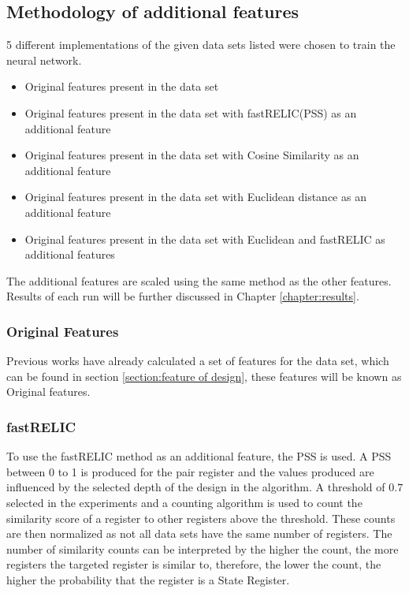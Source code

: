\documentclass{tum-book}
\begin{document}
        \subsection{Methodology of additional features}\label{subsection:methodology of additional features}
        5 different implementations of the given data sets listed were chosen to train the neural network.
        \bigskip\begin{itemize}
            \item Original features present in the data set 
            \item Original features present in the data set with fastRELIC(PSS) as an additional feature
            \item Original features present in the data set with Cosine Similarity as an additional feature
            \item Original features present in the data set with Euclidean distance as an additional feature
            \item Original features present in the data set with Euclidean and fastRELIC as additional features
        \end{itemize}
        The additional features are scaled using the same method as the other features. Results of each run will be further discussed in Chapter \ref{chapter:results}.
        
        
        \subsubsection{Original Features}
        Previous works have already calculated a set of features for the data set, which can be found in section \ref{section:feature of design}, these features will be known as Original features.

        \newpage\subsubsection{fastRELIC}\label{subsubsection:pss}
        To use the fastRELIC method as an additional feature, the PSS is used. A PSS between 0 to 1 is produced for the pair register and the values produced are influenced by the selected depth of the design in the algorithm. A threshold of $0.7$ selected in the experiments and a counting algorithm is used to count the similarity score of a register to other registers above the threshold. These counts are then normalized as not all data sets have the same number of registers. The number of similarity counts can be interpreted by the higher the count, the more registers the targeted register is similar to, therefore, the lower the count, the higher the probability that the register is a State Register. 
\end{document}
